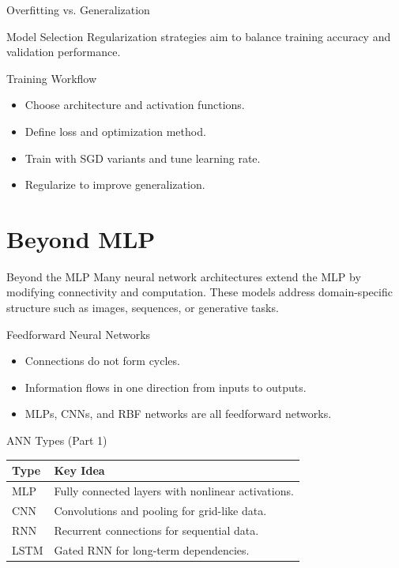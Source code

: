 \documentclass[10pt]{beamer}
\begin{document}
\begin{frame}{Overfitting vs. Generalization}
  \justifying
  \begin{examplebox}{Model Selection}
    Regularization strategies aim to balance training accuracy and validation performance.
  \end{examplebox}
\end{frame}

\begin{frame}{Training Workflow}
  \justifying
  \begin{itemize}
    \item Choose architecture and activation functions.
    \item Define loss and optimization method.
    \item Train with SGD variants and tune learning rate.
    \item Regularize to improve generalization.
  \end{itemize}
\end{frame}

\section{Beyond MLP}

\begin{frame}{Beyond the MLP}
  \justifying
  Many neural network architectures extend the MLP by modifying connectivity and computation.
  These models address domain-specific structure such as images, sequences, or generative tasks.
\end{frame}

\begin{frame}{Feedforward Neural Networks}
  \justifying
  \begin{itemize}
    \item Connections do not form cycles.
    \item Information flows in one direction from inputs to outputs.
    \item MLPs, CNNs, and RBF networks are all feedforward networks.
  \end{itemize}
\end{frame}

\begin{frame}{ANN Types (Part 1)}
  \justifying
  \begin{table}[ht]
    \centering
    \begin{tabular}{p{2.5cm} p{7cm}}
      \toprule
      \textbf{Type} & \textbf{Key Idea} \\
      \midrule
      MLP & Fully connected layers with nonlinear activations. \\
      CNN & Convolutions and pooling for grid-like data. \\
      RNN & Recurrent connections for sequential data. \\
      LSTM & Gated RNN for long-term dependencies. \\
      \bottomrule
    \end{tabular}
  \end{table}
\end{frame}
\end{document}
